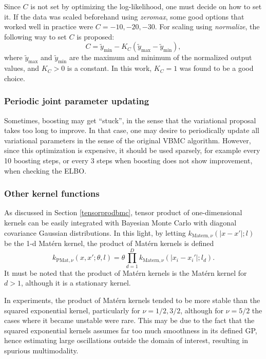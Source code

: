 Since $C$ is not set by optimizing the log-likelihood, one must decide on how to set it. If the data was scaled beforehand using \textit{zeromax}, some good options that worked well in practice were $C = -10,-20,-30$. For scaling using \textit{normalize}, the following way to set $C$ is proposed:
\begin{equation}
C = \tilde{y}_{\min} - K_{C}(\tilde{y}_{\max} - \tilde{y}_{\min}),
\end{equation}
where $\tilde{y}_{\max}$ and $\tilde{y}_{\min}$ are the maximum and minimum of the normalized output values, and $K_C > 0$ is a constant. In this work, $K_C = 1$ was found to be a good choice.

\subsubsection{Periodic joint parameter updating}\label{jointparameterupdating}
Sometimes, boosting may get \enquote{stuck}, in the sense that the variational proposal takes too long to improve. In that case, one may desire to periodically update all variational parameters in the sense of the original VBMC algorithm. However, since this optimization is expensive, it should be used sparsely, for example every 10 boosting steps, or every 3 steps when boosting does not show improvement, when checking the ELBO.

\subsubsection{Other kernel functions}
As discussed in Section \ref{tensorprodbmc}, tensor product of one-dimensional kernels can be easily integrated with Bayesian Monte Carlo with diagonal covariance Gaussian distributions. In this light, by letting $k_{\text{Matern},\nu}(|x-x'|;l)$ be the 1-d Matérn kernel, the product of Matérn kernels is defined
\begin{equation}
 k_{\text{PMat},\nu}(x,x';\theta,l) = \theta \prod_{d=1}^D k_{\text{Matern},\nu}(|x_i-x_i'|;l_d).
\end{equation}
It must be noted that the product of Matérn kernels is  the Matérn kernel for $d > 1$, although it is a stationary kernel.

In experiments, the product of Matérn kernels tended to be more stable than the squared exponential kernel, particularly for $\nu = 1/2,3/2$, although for $\nu = 5/2$ the cases where it became unstable were rare. This may be due to the fact that the squared exponential kernels assumes far too much smoothness in its defined GP, hence estimating large oscillations outside the domain of interest, resulting in spurious multimodality.

